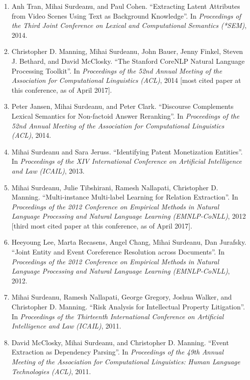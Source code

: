 \documentclass[10pt]{article}
\newcommand{\ve}[1]{{\em #1}} %
\newcommand{\ti}[1]{``#1''} %
\begin{document}
\begin{description}
\begin{enumerate}
\item
Anh Tran, Mihai Surdeanu, and Paul Cohen.  \ti{Extracting Latent Attributes from Video Scenes Using Text as Background Knowledge}.  In \ve{Proceedings of the Third Joint Conference on Lexical and Computational Semantics (*SEM)}, 2014.

\item
Christopher D. Manning, Mihai Surdeanu, John Bauer, Jenny Finkel, Steven J. Bethard, and David McClosky.  \ti{The Stanford CoreNLP Natural Language Processing Toolkit}.  In \ve{Proceedings of the 52nd Annual Meeting of the Association for Computational Linguistics (ACL)}, 2014 [most cited paper at this conference, as of April 2017].

\item
Peter Jansen, Mihai Surdeanu, and Peter Clark.  \ti{Discourse Complements Lexical Semantics for Non-factoid Answer Reranking}.  In \ve{Proceedings of the 52nd Annual Meeting of the Association for Computational Linguistics (ACL)}, 2014.

\item
Mihai Surdeanu and Sara Jeruss.  \ti{Identifying Patent Monetization Entities}.  In \ve{Proceedings of the XIV International Conference on Artificial Intelligence and Law (ICAIL)}, 2013.

\item
Mihai Surdeanu, Julie Tibshirani, Ramesh Nallapati, Christopher D. Manning.  \ti{Multi-instance Multi-label Learning for Relation Extraction}.  In \ve{Proceedings of the 2012 Conference on Empirical Methods in Natural Language Processing and Natural Language Learning (EMNLP-CoNLL)}, 2012 [third most cited paper at this conference, as of April 2017].

\item
Heeyoung Lee, Marta Recasens, Angel Chang, Mihai Surdeanu, Dan Jurafsky.  \ti{Joint Entity and Event Coreference Resolution across Documents}.  In \ve{Proceedings of the 2012 Conference on Empirical Methods in Natural Language Processing and Natural Language Learning (EMNLP-CoNLL)}, 2012.

\item
Mihai Surdeanu, Ramesh Nallapati, George Gregory, Joshua Walker, and Christopher D. Manning.  \ti{Risk Analysis for Intellectual Property Litigation}.  In \ve{Proceedings of the Thirteenth International Conference on Artificial Intelligence and Law (ICAIL)}, 2011.

\item
David McClosky, Mihai Surdeanu, and Christopher D. Manning.  \ti{Event Extraction as Dependency Parsing}.  In \ve{Proceedings of the 49th Annual Meeting of the Association for Computational Linguistics: Human Language Technologies (ACL)}, 2011.


\end{enumerate}
\end{description}
\end{document}
